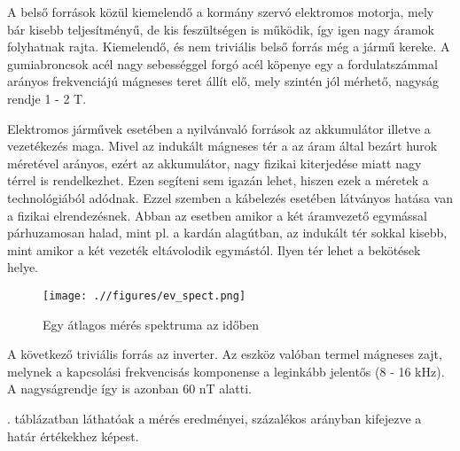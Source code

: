 A belső források közül kiemelendő a kormány szervó elektromos motorja, mely bár kisebb teljesítményű, de kis feszültségen is működik, így igen nagy áramok folyhatnak rajta. Kiemelendő, és nem triviális belső forrás még a jármű kereke. A gumiabroncsok acél nagy sebességgel forgó acél köpenye egy a fordulatszámmal arányos frekvenciájú mágneses teret állít elő, mely szintén jól mérhető, nagyság rendje 1 - 2 \mu{}T.

Elektromos járművek esetében a nyilvánvaló források az akkumulátor illetve a vezetékezés maga. Mivel az indukált mágneses tér a az áram által bezárt hurok méretével arányos, ezért az akkumulátor, nagy fizikai kiterjedése miatt nagy térrel is rendelkezhet. Ezen segíteni sem igazán lehet, hiszen ezek a méretek a technológiából adódnak. Ezzel szemben a kábelezés esetében látványos hatása van a fizikai elrendezésnek. Abban az esetben amikor a két áramvezető egymással párhuzamosan halad, mint pl. a kardán alagútban, az indukált tér sokkal kisebb, mint amikor a két vezeték eltávolodik egymástól. Ilyen tér lehet a bekötések helye.

\begin{figure}[h]
 \centerline{\texttt{[image: .//figures/ev\_spect.png]}}
 \caption{Egy átlagos mérés spektruma az időben}
 \label{fig:mag_spect}
\end{figure}

A következő triviális forrás az inverter. Az eszköz valóban termel mágneses zajt, melynek a kapcsolási frekvencisás komponense a leginkább jelentős (8 - 16 kHz). A nagyságrendje így is azonban 60 nT alatti.

. táblázatban láthatóak a mérés eredményei, százalékos arányban kifejezve a határ értékekhez képest.

